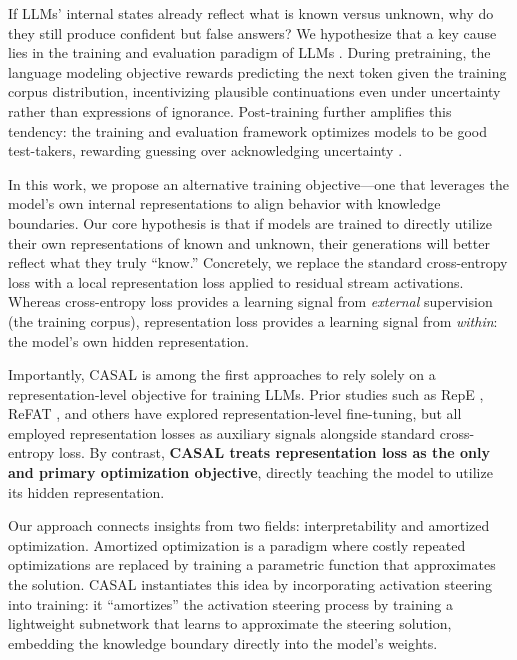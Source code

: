 If LLMs' internal states already reflect what is known versus unknown, why do they still produce confident but false answers? We hypothesize that a key cause lies in the training and evaluation paradigm of LLMs \citep{knowledgeboundarysurvey, openai2025whyhallucinate}. During pretraining, the language modeling objective rewards predicting the next token given the training corpus distribution, incentivizing plausible continuations even under uncertainty rather than expressions of ignorance. Post-training further amplifies this tendency: the training and evaluation framework optimizes models to be good test-takers, rewarding guessing over acknowledging uncertainty \citep{gekhman2024doesfinetuningllmsnew}.

In this work, we propose an alternative training objective---one that leverages the model's own internal representations to align behavior with knowledge boundaries. Our core hypothesis is that if models are trained to directly utilize their own representations of known and unknown, their generations will better reflect what they truly ``know.'' Concretely, we replace the standard cross-entropy loss with a local representation loss applied to residual stream activations. Whereas cross-entropy loss provides a learning signal from \textit{external} supervision (the training corpus), representation loss provides a learning signal from \textit{within}: the model's own hidden representation.

Importantly, CASAL is among the first approaches to rely solely on a representation-level objective for training LLMs. Prior studies such as RepE \citep{zou2025representationengineering}, ReFAT \citep{yu2024refat}, and others \citep{yu2024mechanistic, ablationfinetuning, chen2025personavectors, representationbending} have explored representation-level fine-tuning, but all employed representation losses as auxiliary signals alongside standard cross-entropy loss. By contrast, \textbf{CASAL treats representation loss as the only and primary optimization objective}, directly teaching the model to utilize its hidden representation.

Our approach connects insights from two fields: interpretability and amortized optimization. Amortized optimization \citep{kingma2013auto, rezende2014stochastic, gershman2014amortized} is a paradigm where costly repeated optimizations are replaced by training a parametric function that approximates the solution. CASAL instantiates this idea by incorporating activation steering into training: it ``amortizes'' the activation steering process by training a lightweight subnetwork that learns to approximate the steering solution, embedding the knowledge boundary directly into the model's weights.

